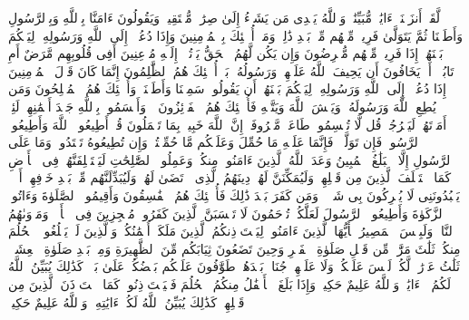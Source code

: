 \stopbuffer
\startbuffer[\q:24:46]
لَّقَدۡ أَنزَلۡنَاۤ ءَایَٰتࣲ مُّبَیِّنَٰتࣲۚ وَٱللَّهُ یَهۡدِی مَن یَشَاۤءُ إِلَىٰ صِرَٰطࣲ مُّسۡتَقِیمࣲ%
\stopbuffer
\startbuffer[\q:24:47]
وَیَقُولُونَ ءَامَنَّا بِٱللَّهِ وَبِٱلرَّسُولِ وَأَطَعۡنَا ثُمَّ یَتَوَلَّىٰ فَرِیقࣱ مِّنۡهُم مِّنۢ بَعۡدِ ذَٰلِكَۚ وَمَاۤ أُو۟لَٰۤئِكَ بِٱلۡمُؤۡمِنِینَ%
\stopbuffer
\startbuffer[\q:24:48]
وَإِذَا دُعُوۤا۟ إِلَى ٱللَّهِ وَرَسُولِهِۦ لِیَحۡكُمَ بَیۡنَهُمۡ إِذَا فَرِیقࣱ مِّنۡهُم مُّعۡرِضُونَ%
\stopbuffer
\startbuffer[\q:24:49]
وَإِن یَكُن لَّهُمُ ٱلۡحَقُّ یَأۡتُوۤا۟ إِلَیۡهِ مُذۡعِنِینَ%
\stopbuffer
\startbuffer[\q:24:50]
أَفِی قُلُوبِهِم مَّرَضٌ أَمِ ٱرۡتَابُوۤا۟ أَمۡ یَخَافُونَ أَن یَحِیفَ ٱللَّهُ عَلَیۡهِمۡ وَرَسُولُهُۥۚ بَلۡ أُو۟لَٰۤئِكَ هُمُ ٱلظَّٰلِمُونَ%
\stopbuffer
\startbuffer[\q:24:51]
إِنَّمَا كَانَ قَوۡلَ ٱلۡمُؤۡمِنِینَ إِذَا دُعُوۤا۟ إِلَى ٱللَّهِ وَرَسُولِهِۦ لِیَحۡكُمَ بَیۡنَهُمۡ أَن یَقُولُوا۟ سَمِعۡنَا وَأَطَعۡنَاۚ وَأُو۟لَٰۤئِكَ هُمُ ٱلۡمُفۡلِحُونَ%
\stopbuffer
\startbuffer[\q:24:52]
وَمَن یُطِعِ ٱللَّهَ وَرَسُولَهُۥ وَیَخۡشَ ٱللَّهَ وَیَتَّقۡهِ فَأُو۟لَٰۤئِكَ هُمُ ٱلۡفَاۤئِزُونَ%
\stopbuffer
\startbuffer[\q:24:53]
۞ وَأَقۡسَمُوا۟ بِٱللَّهِ جَهۡدَ أَیۡمَٰنِهِمۡ لَئِنۡ أَمَرۡتَهُمۡ لَیَخۡرُجُنَّۖ قُل لَّا تُقۡسِمُوا۟ۖ طَاعَةࣱ مَّعۡرُوفَةٌۚ إِنَّ ٱللَّهَ خَبِیرُۢ بِمَا تَعۡمَلُونَ%
\stopbuffer
\startbuffer[\q:24:54]
قُلۡ أَطِیعُوا۟ ٱللَّهَ وَأَطِیعُوا۟ ٱلرَّسُولَۖ فَإِن تَوَلَّوۡا۟ فَإِنَّمَا عَلَیۡهِ مَا حُمِّلَ وَعَلَیۡكُم مَّا حُمِّلۡتُمۡۖ وَإِن تُطِیعُوهُ تَهۡتَدُوا۟ۚ وَمَا عَلَى ٱلرَّسُولِ إِلَّا ٱلۡبَلَٰغُ ٱلۡمُبِینُ%
\stopbuffer
\startbuffer[\q:24:55]
وَعَدَ ٱللَّهُ ٱلَّذِینَ ءَامَنُوا۟ مِنكُمۡ وَعَمِلُوا۟ ٱلصَّٰلِحَٰتِ لَیَسۡتَخۡلِفَنَّهُمۡ فِی ٱلۡأَرۡضِ كَمَا ٱسۡتَخۡلَفَ ٱلَّذِینَ مِن قَبۡلِهِمۡ وَلَیُمَكِّنَنَّ لَهُمۡ دِینَهُمُ ٱلَّذِی ٱرۡتَضَىٰ لَهُمۡ وَلَیُبَدِّلَنَّهُم مِّنۢ بَعۡدِ خَوۡفِهِمۡ أَمۡنࣰاۚ یَعۡبُدُونَنِی لَا یُشۡرِكُونَ بِی شَیۡءࣰاۚ وَمَن كَفَرَ بَعۡدَ ذَٰلِكَ فَأُو۟لَٰۤئِكَ هُمُ ٱلۡفَٰسِقُونَ%
\stopbuffer
\startbuffer[\q:24:56]
وَأَقِیمُوا۟ ٱلصَّلَوٰةَ وَءَاتُوا۟ ٱلزَّكَوٰةَ وَأَطِیعُوا۟ ٱلرَّسُولَ لَعَلَّكُمۡ تُرۡحَمُونَ%
\stopbuffer
\startbuffer[\q:24:57]
لَا تَحۡسَبَنَّ ٱلَّذِینَ كَفَرُوا۟ مُعۡجِزِینَ فِی ٱلۡأَرۡضِۚ وَمَأۡوَىٰهُمُ ٱلنَّارُۖ وَلَبِئۡسَ ٱلۡمَصِیرُ%
\stopbuffer
\startbuffer[\q:24:58]
یَٰۤأَیُّهَا ٱلَّذِینَ ءَامَنُوا۟ لِیَسۡتَءۡذِنكُمُ ٱلَّذِینَ مَلَكَتۡ أَیۡمَٰنُكُمۡ وَٱلَّذِینَ لَمۡ یَبۡلُغُوا۟ ٱلۡحُلُمَ مِنكُمۡ ثَلَٰثَ مَرَّٰتࣲۚ مِّن قَبۡلِ صَلَوٰةِ ٱلۡفَجۡرِ وَحِینَ تَضَعُونَ ثِیَابَكُم مِّنَ ٱلظَّهِیرَةِ وَمِنۢ بَعۡدِ صَلَوٰةِ ٱلۡعِشَاۤءِۚ ثَلَٰثُ عَوۡرَٰتࣲ لَّكُمۡۚ لَیۡسَ عَلَیۡكُمۡ وَلَا عَلَیۡهِمۡ جُنَاحُۢ بَعۡدَهُنَّۚ طَوَّٰفُونَ عَلَیۡكُم بَعۡضُكُمۡ عَلَىٰ بَعۡضࣲۚ كَذَٰلِكَ یُبَیِّنُ ٱللَّهُ لَكُمُ ٱلۡءَایَٰتِۗ وَٱللَّهُ عَلِیمٌ حَكِیمࣱ%
\stopbuffer
\startbuffer[\q:24:59]
وَإِذَا بَلَغَ ٱلۡأَطۡفَٰلُ مِنكُمُ ٱلۡحُلُمَ فَلۡیَسۡتَءۡذِنُوا۟ كَمَا ٱسۡتَءۡذَنَ ٱلَّذِینَ مِن قَبۡلِهِمۡۚ كَذَٰلِكَ یُبَیِّنُ ٱللَّهُ لَكُمۡ ءَایَٰتِهِۦۗ وَٱللَّهُ عَلِیمٌ حَكِیمࣱ%
\stopbuffer
